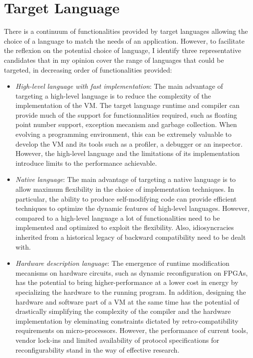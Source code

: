 \section{Target Language}

There is a continuum of functionalities provided by target languages allowing
the choice of a language to match the needs of an application. However, to
facilitate the reflexion on the potential choice of language, I identify three
representative candidates that in my opinion cover the range of languages that
could be targeted, in decreasing order of functionalities provided:
\begin{itemize}
    \item \textit{High-level language with fast implementation}: The main
    advantage of targeting a high-level language is to reduce the complexity of
    the implementation of the VM. The target language runtime and compiler can
    provide much of the support for functionnalities required, such as floating
    point number support, exception mecanism and garbage collection. When
    evolving a programming environment, this can be extremely valuable to
    develop the VM and its tools such as a profiler, a debugger or an inspector.
    However, the high-level language and the limitations of its implementation
    introduce limits to the performance achievable.
    \item \textit{Native language}: The main advantage of targeting a native
    language is to allow maximum flexibility in the choice of implementation
    techniques.  In particular, the ability to produce self-modifying code
    can provide efficient techniques to optimize the dynamic features of
    high-level languages. However, compared to a high-level language a lot of
    functionalities need to be implemented and optimized to exploit the
    flexibility. Also, idiosyncracies inherited from a historical legacy of
    backward compatibility need to be dealt with.
    \item \textit{Hardware description language}: The emergence of runtime
    modification mecanisms on hardware circuits, such as dynamic
    reconfiguration on FPGAs, has the potential to bring higher-performance at
    a lower cost in energy by specializing the hardware to the running program.
    In addition, designing the hardware and software part of a VM at the same
    time has the potential of drastically simplifying the complexity of the
    compiler and the hardware implementation by eleminating constraints
    dictated by retro-compatibility requirements on micro-processors.
    However, the performance of current tools, vendor lock-ins and limited
    availability of protocol specifications for reconfigurability stand in the
    way of effective research.
\end{itemize}

